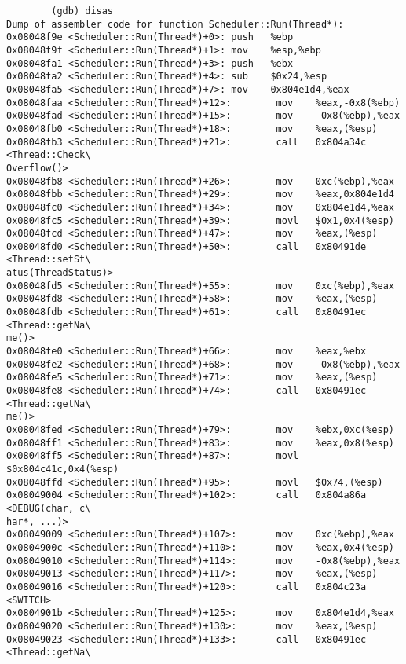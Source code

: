 \documentclass[letterpaper, 10pt]{article}
\begin{document}
	\begin{verbatim}
		(gdb) disas
Dump of assembler code for function Scheduler::Run(Thread*):
0x08048f9e <Scheduler::Run(Thread*)+0>: push   %ebp
0x08048f9f <Scheduler::Run(Thread*)+1>: mov    %esp,%ebp
0x08048fa1 <Scheduler::Run(Thread*)+3>: push   %ebx
0x08048fa2 <Scheduler::Run(Thread*)+4>: sub    $0x24,%esp
0x08048fa5 <Scheduler::Run(Thread*)+7>: mov    0x804e1d4,%eax
0x08048faa <Scheduler::Run(Thread*)+12>:        mov    %eax,-0x8(%ebp)
0x08048fad <Scheduler::Run(Thread*)+15>:        mov    -0x8(%ebp),%eax
0x08048fb0 <Scheduler::Run(Thread*)+18>:        mov    %eax,(%esp)
0x08048fb3 <Scheduler::Run(Thread*)+21>:        call   0x804a34c <Thread::Check\
Overflow()>
0x08048fb8 <Scheduler::Run(Thread*)+26>:        mov    0xc(%ebp),%eax
0x08048fbb <Scheduler::Run(Thread*)+29>:        mov    %eax,0x804e1d4
0x08048fc0 <Scheduler::Run(Thread*)+34>:        mov    0x804e1d4,%eax
0x08048fc5 <Scheduler::Run(Thread*)+39>:        movl   $0x1,0x4(%esp)
0x08048fcd <Scheduler::Run(Thread*)+47>:        mov    %eax,(%esp)
0x08048fd0 <Scheduler::Run(Thread*)+50>:        call   0x80491de <Thread::setSt\
atus(ThreadStatus)>
0x08048fd5 <Scheduler::Run(Thread*)+55>:        mov    0xc(%ebp),%eax
0x08048fd8 <Scheduler::Run(Thread*)+58>:        mov    %eax,(%esp)
0x08048fdb <Scheduler::Run(Thread*)+61>:        call   0x80491ec <Thread::getNa\
me()>
0x08048fe0 <Scheduler::Run(Thread*)+66>:        mov    %eax,%ebx
0x08048fe2 <Scheduler::Run(Thread*)+68>:        mov    -0x8(%ebp),%eax
0x08048fe5 <Scheduler::Run(Thread*)+71>:        mov    %eax,(%esp)
0x08048fe8 <Scheduler::Run(Thread*)+74>:        call   0x80491ec <Thread::getNa\
me()>
0x08048fed <Scheduler::Run(Thread*)+79>:        mov    %ebx,0xc(%esp)
0x08048ff1 <Scheduler::Run(Thread*)+83>:        mov    %eax,0x8(%esp)
0x08048ff5 <Scheduler::Run(Thread*)+87>:        movl   $0x804c41c,0x4(%esp)
0x08048ffd <Scheduler::Run(Thread*)+95>:        movl   $0x74,(%esp)
0x08049004 <Scheduler::Run(Thread*)+102>:       call   0x804a86a <DEBUG(char, c\
har*, ...)>
0x08049009 <Scheduler::Run(Thread*)+107>:       mov    0xc(%ebp),%eax
0x0804900c <Scheduler::Run(Thread*)+110>:       mov    %eax,0x4(%esp)
0x08049010 <Scheduler::Run(Thread*)+114>:       mov    -0x8(%ebp),%eax
0x08049013 <Scheduler::Run(Thread*)+117>:       mov    %eax,(%esp)
0x08049016 <Scheduler::Run(Thread*)+120>:       call   0x804c23a <SWITCH>
0x0804901b <Scheduler::Run(Thread*)+125>:       mov    0x804e1d4,%eax
0x08049020 <Scheduler::Run(Thread*)+130>:       mov    %eax,(%esp)
0x08049023 <Scheduler::Run(Thread*)+133>:       call   0x80491ec <Thread::getNa\

\end{verbatim}
\end{document}
